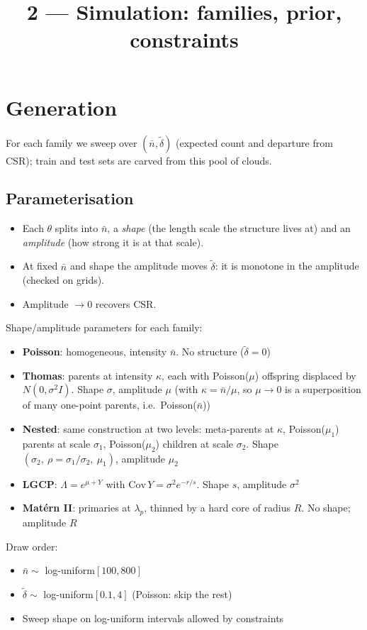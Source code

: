 \documentclass[11pt]{article}
\title{2 --- Simulation: families, prior, constraints}
\date{}
\newcommand{\dt}{\tilde\delta}
\newcommand{\nb}{\bar n}
\begin{document}
\maketitle

\section{Generation}
For each family we sweep over $(\nb,\dt)$ (expected count and departure from CSR); train and test sets are carved from this pool of clouds.

\subsection*{Parameterisation}
\begin{itemize}
  \item Each $\theta$ splits into $\nb$, a \emph{shape} (the length scale the structure lives at) and an \emph{amplitude} (how strong it is at that scale). 
  \item At fixed $\nb$ and shape the amplitude moves $\dt$: it is monotone in the amplitude (checked on grids).
  \item Amplitude $\to0$ recovers CSR.
\end{itemize}
Shape/amplitude parameters for each family:
\begin{itemize}
  \item \textbf{Poisson}: homogeneous, intensity $\nb$. No structure ($\dt=0$)
  \item \textbf{Thomas}: parents at intensity $\kappa$, each with Poisson($\mu$) offspring displaced by $N(0,\sigma^2 I)$. Shape $\sigma$, amplitude $\mu$ (with $\kappa=\nb/\mu$, so $\mu\to0$ is a superposition of many one-point parents, i.e.\ Poisson($\nb$))
  \item \textbf{Nested}: same construction at two levels: meta-parents at $\kappa$, Poisson($\mu_1$) parents at scale $\sigma_1$, Poisson($\mu_2$) children at scale $\sigma_2$. Shape $(\sigma_2,\ \rho=\sigma_1/\sigma_2,\ \mu_1)$, amplitude $\mu_2$
  \item \textbf{LGCP}: $\Lambda = e^{\mu+Y}$ with $\mathrm{Cov}\,Y = \sigma^2 e^{-r/s}$. Shape $s$, amplitude $\sigma^2$
  \item \textbf{Mat\'ern II}: primaries at $\lambda_p$, thinned by a hard core of radius $R$. No shape; amplitude $R$
\end{itemize}
Draw order:
\begin{itemize}
    \item $\nb\sim$ log-uniform$[100,800]$
    \item $\dt\sim$ log-uniform$[0.1,4]$ (Poisson: skip the rest)
    \item Sweep shape on log-uniform intervals allowed by constraints
\end{itemize}
\end{document}
